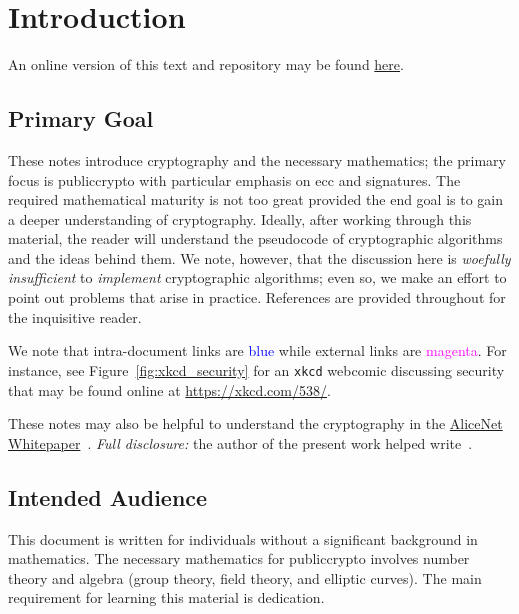 \chapter{Introduction}
\label{chap:intro}

An online version of this text and repository may be found
\href{https://github.com/chgorman/Notes-Math-Crypto}{here}.



\section{Primary Goal}

These notes introduce cryptography and the necessary mathematics;
the primary focus is \gls{publiccrypto}
with particular emphasis on \gls{ecc} and \glspl{signature}.
The required mathematical maturity is not too great
provided the end goal is to gain a deeper understanding of cryptography.
Ideally, after working through this material, the reader
will understand the pseudocode of cryptographic algorithms
and the ideas behind them.
We note, however, that the discussion here is \emph{woefully insufficient}
to \emph{implement} cryptographic algorithms;
even so, we make an effort to point out
problems that arise in practice.
References are provided throughout for the inquisitive reader.

We note that intra-document links are \textcolor{blue}{blue}
while external links are \textcolor{magenta}{magenta}.
For instance, see Figure~\ref{fig:xkcd_security} for an
\texttt{xkcd} webcomic discussing security
that may be found online at \url{https://xkcd.com/538/}.



These notes may also be helpful to understand the cryptography in the
\href{https://github.com/alicenet/whitepaper}{AliceNet
Whitepaper}~\cite{AliceNetWhitepaper}.
\emph{Full disclosure:} the author of the present work
helped write~\cite{AliceNetWhitepaper}.



\section{Intended Audience}

This document is written for individuals without a significant
background in mathematics.
The necessary mathematics for \gls{publiccrypto} involves
\gls{number theory} and algebra (\gls{group} theory, \gls{field} theory, and
\glspl{elliptic curve}).
The main requirement for learning this material is dedication.


